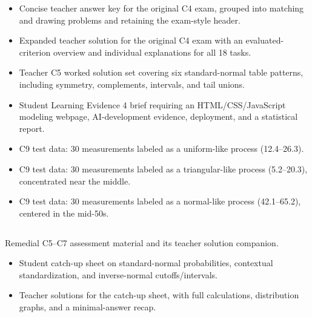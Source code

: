 \begin{itemize}
  \item {}

  Concise teacher answer key for the original C4 exam, grouped into matching and drawing problems and retaining the exam-style header.

  \item {}

  Expanded teacher solution for the original C4 exam with an evaluated-criterion overview and individual explanations for all 18 tasks.

  \item {}

  Teacher C5 worked solution set covering six standard-normal table patterns, including symmetry, complements, intervals, and tail unions.

  \item {}

  Student Learning Evidence 4 brief requiring an HTML/CSS/JavaScript modeling webpage, AI-development evidence, deployment, and a statistical report.

  \item {}

  C9 test data: 30 measurements labeled as a uniform-like process (12.4–26.3).

  \item {}

  C9 test data: 30 measurements labeled as a triangular-like process (5.2–20.3), concentrated near the middle.

  \item {}

  C9 test data: 30 measurements labeled as a normal-like process (42.1–65.2), centered in the mid-50s.
\end{itemize}

\subsection{}

Remedial C5–C7 assessment material and its teacher solution companion.

\begin{itemize}
  \item {}

  Student catch-up sheet on standard-normal probabilities, contextual standardization, and inverse-normal cutoffs/intervals.

  \item {}

  Teacher solutions for the catch-up sheet, with full calculations, distribution graphs, and a minimal-answer recap.
\end{itemize}

